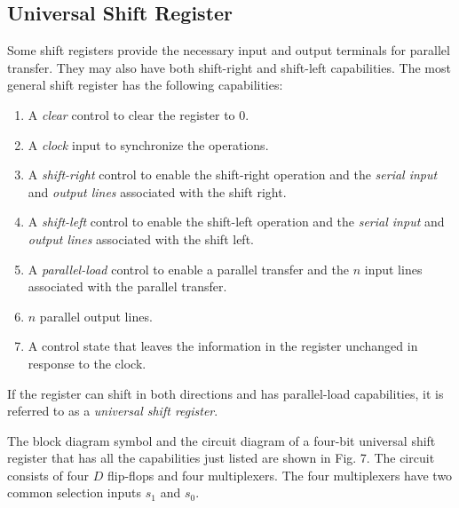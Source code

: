 \vspace*{\fill}
\columnbreak

\subsection{Universal Shift Register}
\label{subsec:universal-shift-register}

Some shift registers provide the necessary input and output terminals for parallel transfer. They may also have both shift-right and shift-left capabilities. The most general shift register has the following capabilities:
\begin{enumerate}[leftmargin=0.7cm]
  \item A \textit{clear} control to clear the register to 0.
  \item A \textit{clock} input to synchronize the operations.
  \item A \textit{shift-right} control to enable the shift-right operation and the \textit{serial input} and \textit{output lines} associated with the shift right.
  \item A \textit{shift-left} control to enable the shift-left operation and the \textit{serial input} and \textit{output lines} associated with the shift left.
  \item A \textit{parallel-load} control to enable a parallel transfer and the $n$ input lines associated with the parallel transfer.
  \item $n$ parallel output lines.
  \item A control state that leaves the information in the register unchanged in response to the clock.
\end{enumerate}

If the register can shift in both directions and has parallel-load capabilities, it is referred to as a \textit{universal shift register}.

The block diagram symbol and the circuit diagram of a four-bit universal shift register that has all the capabilities just listed are shown in Fig. 7. The circuit consists of four $D$ flip-flops and four multiplexers. The four multiplexers have two common selection inputs $s_1$ and $s_0$.

